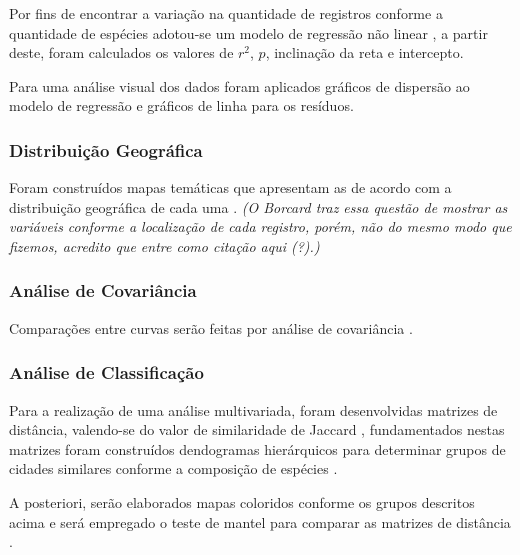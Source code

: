 Por fins de encontrar a variação na quantidade de registros conforme a quantidade de espécies adotou-se um modelo de regressão não linear \cite{NicholasJ.Gotelli;AaronM.Ellison2010}, a partir deste, foram calculados os valores de $r^2$, $p$, inclinação da reta e intercepto.

Para uma análise visual dos dados foram aplicados gráficos de dispersão ao modelo de regressão \cite{NicholasJ.Gotelli;AaronM.Ellison2010} e gráficos de linha para os resíduos.

\subsubsection{Distribuição Geográfica}

Foram construídos mapas temáticas que apresentam as de acordo com a distribuição geográfica de cada uma \cite{Borcard2011}. \color{blue}\textit{(O Borcard traz essa questão de mostrar as variáveis conforme a localização de cada registro, porém, não do mesmo modo que fizemos, acredito que entre como citação aqui (?).)}\color{black}

\subsubsection{Análise de Covariância}

Comparações entre curvas serão feitas por análise de covariância \cite{NicholasJ.Gotelli;AaronM.Ellison2010,Borcard2011, Field2012}.

\subsubsection{Análise de Classificação}

Para a realização de uma análise multivariada, foram desenvolvidas matrizes de distância, valendo-se do valor de similaridade de Jaccard \cite{VALENTIN2000,greenacre2014multivariate}, fundamentados nestas matrizes foram construídos dendogramas hierárquicos para determinar grupos de cidades similares conforme a composição de espécies \cite{VALENTIN2000,greenacre2014multivariate,Borcard2011}.

A posteriori, serão elaborados mapas coloridos conforme os grupos descritos acima e será empregado o teste de mantel para comparar as matrizes de distância \cite{Borcard2011,VALENTIN2000}.
